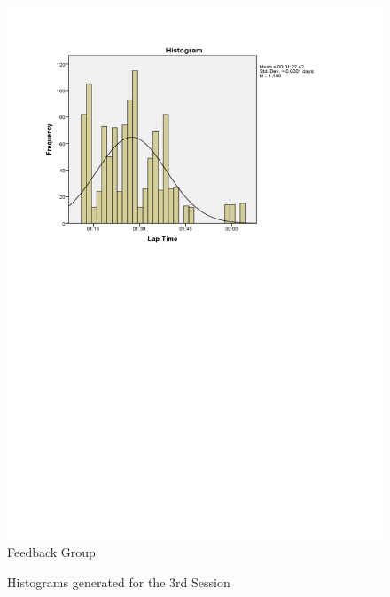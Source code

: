 \begin{figure}
\begin{minipage}{0.45\textwidth}
		\includegraphics[width=\textwidth]{charts/3-1}
		Feedback Group
	\end{minipage}
	\caption{Histograms generated for the 3rd Session}
	\label{fig:hist-3}
\end{figure}

